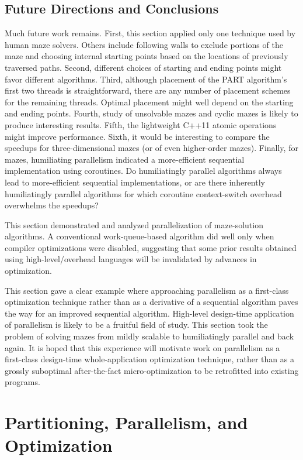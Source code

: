 \subsection{Future Directions and Conclusions}
\label{sec:SMPdesign:Future Directions and Conclusions}

Much future work remains.
First, this section applied only one technique used by human maze solvers.
Others include following walls to exclude portions of the maze
and choosing internal starting points based on the
locations of previously traversed paths.
Second, different choices of
starting and ending points might favor different algorithms.
Third, although placement of the PART algorithm's
first two threads is straightforward, there are any number of
placement schemes for the remaining threads.
Optimal placement might well depend on the starting and ending points.
Fourth, study of unsolvable mazes and cyclic mazes
is likely to produce interesting results.
Fifth, the lightweight C++11 atomic operations might improve performance.
Sixth, it would be interesting to compare the speedups for
three-dimensional mazes (or of even higher-order mazes).
Finally, for mazes, humiliating parallelism indicated a
more-efficient sequential implementation using coroutines.
Do humiliatingly parallel algorithms always lead to more-efficient
sequential implementations, or are there inherently humiliatingly parallel
algorithms for which coroutine context-switch overhead overwhelms the
speedups?

This section demonstrated and analyzed parallelization of maze-solution
algorithms.
A conventional work-queue-based algorithm did well only when compiler
optimizations were disabled, suggesting that some prior results obtained
using high-level/overhead languages will be invalidated
by advances in optimization.

This section gave a clear example where approaching parallelism
as a first-class optimization technique rather than as a derivative of a
sequential algorithm paves the way for an improved sequential algorithm.
High-level design-time application of parallelism is likely to be a
fruitful field of study.
This section took the problem of solving mazes from mildly scalable
to humiliatingly parallel and back again.
It is hoped that this experience will motivate work on parallelism
as a first-class design-time whole-application optimization technique,
rather than as a grossly suboptimal after-the-fact micro-optimization
to be retrofitted into existing programs.

\section{Partitioning, Parallelism, and Optimization}
\label{sec:SMPdesign:Partitioning, Parallelism, and Optimization}

